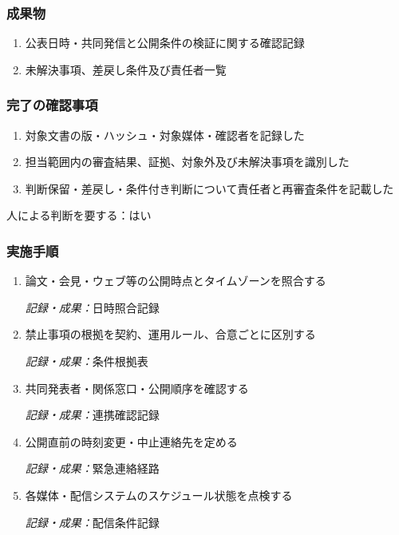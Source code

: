 \documentclass[a4paper,11pt]{article}
\begin{document}
\subsubsection*{成果物}
\begin{enumerate}[leftmargin=2em,itemsep=0.35em]
\item 公表日時・共同発信と公開条件の検証に関する確認記録
\item 未解決事項、差戻し条件及び責任者一覧
\end{enumerate}
\subsubsection*{完了の確認事項}
\begin{enumerate}[leftmargin=2em,itemsep=0.35em]
\item 対象文書の版・ハッシュ・対象媒体・確認者を記録した
\item 担当範囲内の審査結果、証拠、対象外及び未解決事項を識別した
\item 判断保留・差戻し・条件付き判断について責任者と再審査条件を記載した
\end{enumerate}
\par 人による判断を要する：はい\par\medskip
\subsubsection*{実施手順}
\begin{enumerate}[leftmargin=2em,itemsep=0.65em]
\item 論文・会見・ウェブ等の公開時点とタイムゾーンを照合する\par\noindent\textit{記録・成果：}日時照合記録\nobreak\smallskip
\item 禁止事項の根拠を契約、運用ルール、合意ごとに区別する\par\noindent\textit{記録・成果：}条件根拠表\nobreak\smallskip
\item 共同発表者・関係窓口・公開順序を確認する\par\noindent\textit{記録・成果：}連携確認記録\nobreak\smallskip
\item 公開直前の時刻変更・中止連絡先を定める\par\noindent\textit{記録・成果：}緊急連絡経路\nobreak\smallskip
\item 各媒体・配信システムのスケジュール状態を点検する\par\noindent\textit{記録・成果：}配信条件記録\nobreak\smallskip
\end{enumerate}
\end{document}
